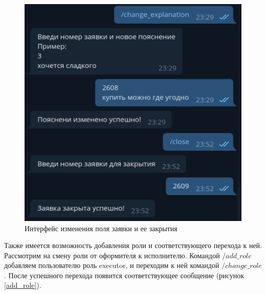 \begin{figure}[H]
	\begin{center}
		\includegraphics[page=1,scale=0.5]{assets/change_close.pdf}
	\end{center}
	\caption{Интерфейс изменения поля заявки и ее закрытия}
	\label{change_close}
\end{figure}

Также имеется возможность добавления роли и соответствующего перехода к ней. Рассмотрим на смену роли от оформителя к исполнителю. Командой $/add\_role$ добавляем пользователю роль executor, и переходим к ней командой $/change\_role$. После успешного перехода появится соответствующее сообщение (рисунок \ref{add_role}). 

